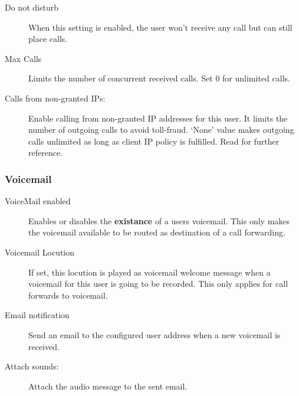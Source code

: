 \documentclass[letterpaper,10pt,english]{sphinxmanual}
\begin{document}
\begin{description}
\item[{Do not disturb}] \leavevmode{}\label{administration_portal/client/vpbx/users:term-do-not-disturb}
When this setting is enabled, the user won't receive any call but can
still place calls.

\item[{Max Calls}] \leavevmode{}\label{administration_portal/client/vpbx/users:term-max-calls}
Limits the number of concurrent received calls. Set 0 for unlimited calls.

\item[{Calls from non-granted IPs:}] \leavevmode{}\label{administration_portal/client/vpbx/users:term-calls-from-non-granted-ips}
Enable calling from non-granted IP addresses for this user.
It limits the number of outgoing calls to avoid toll-fraud.
`None' value makes outgoing calls unlimited as long as client IP
policy is fulfilled. Read {\hyperref[security_and_maintenance/security/authorized_ip_ranges:roadwarrior\string-users]{}} for further reference.

\end{description}


\subsubsection{Voicemail}
\label{administration_portal/client/vpbx/users:voicemail}\begin{description}
\item[{VoiceMail enabled}] \leavevmode{}\label{administration_portal/client/vpbx/users:term-voicemail-enabled}
Enables or disables the \textbf{existance} of a users voicemail.
This only makes the voicemail available to be routed as destination of a call forwarding.

\item[{Voicemail Locution}] \leavevmode{}\label{administration_portal/client/vpbx/users:term-voicemail-locution}
If set, this locution is played as voicemail welcome message when a voicemail
for this user is going to be recorded. This only applies for call forwards
to voicemail.

\item[{Email notification}] \leavevmode{}\label{administration_portal/client/vpbx/users:term-email-notification}
Send an email to the configured user address when a new voicemail is
received.

\item[{Attach sounds:}] \leavevmode{}\label{administration_portal/client/vpbx/users:term-attach-sounds}
Attach the audio message to the sent email.

\end{description}
\end{document}
